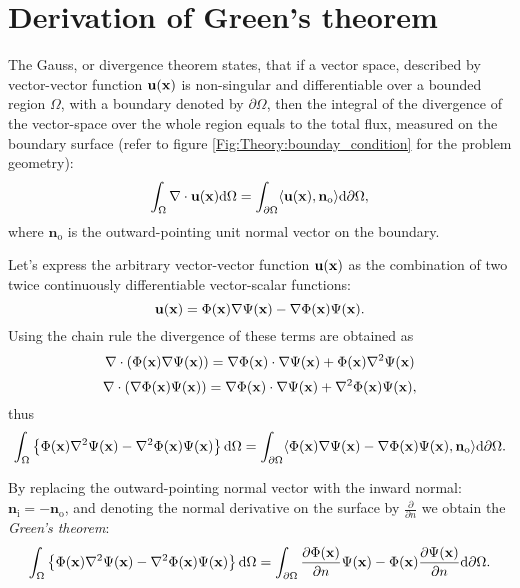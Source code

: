 \section{Derivation of Green's theorem}
\label{App:Green_theorem}

The Gauss, or divergence theorem states, that if a vector space, described by vector-vector function $\mathbf{u}(\mathbf{x})$ is non-singular and differentiable over a bounded region $\Omega$, with a boundary denoted by $\partial \Omega$, then the integral of the divergence of the vector-space over the whole region equals to the total flux, measured on the boundary surface (refer to figure \ref{Fig:Theory:bounday_condition} for the problem geometry):
\begin{equation}
\int_{\Omega} \nabla \cdot \mathbf{u}(\mathbf{x}) \mathrm{d} \Omega = \int_{\partial \Omega} \langle \mathbf{u}(\mathbf{x}),  \mathbf{n}_{\mathrm{o}} \rangle \mathrm{d} \partial\Omega,
\end{equation}
where $\mathbf{n}_{\mathrm{o}} $ is the outward-pointing unit normal vector on the boundary.

Let's express the arbitrary vector-vector function $\mathbf{u}(\mathbf{x})$ as the combination of two twice continuously differentiable vector-scalar functions:
\begin{equation}
\mathbf{u}(\mathbf{x}) = \Phi(\mathbf{x})\nabla \Psi(\mathbf{x}) - \nabla \Phi(\mathbf{x}) \Psi(\mathbf{x}).
\end{equation}
Using the chain rule the divergence of these terms are obtained as
\begin{equation}
\nabla \cdot ( \Phi(\mathbf{x})\nabla \Psi(\mathbf{x}) ) = \nabla \Phi(\mathbf{x})\cdot \nabla \Psi(\mathbf{x}) + \Phi(\mathbf{x}) \nabla^2 \Psi(\mathbf{x})
\end{equation}
\begin{equation}
\nabla \cdot( \nabla \Phi(\mathbf{x}) \Psi(\mathbf{x}) ) = \nabla \Phi(\mathbf{x}) \cdot  \nabla  \Psi(\mathbf{x}) +  \nabla ^2 \Phi(\mathbf{x}) \Psi(\mathbf{x}),
\end{equation}
thus
\begin{equation}
\int_{\Omega} \left\{ \Phi(\mathbf{x}) \nabla^2 \Psi(\mathbf{x}) - \nabla^2 \Phi(\mathbf{x}) \Psi(\mathbf{x}) \right\} \mathrm{d} \Omega = \int_{\partial \Omega} \langle
 \Phi(\mathbf{x}) \nabla \Psi(\mathbf{x}) - \nabla \Phi(\mathbf{x}) \Psi(\mathbf{x}) , \mathbf{n}_{\mathrm{o}} \rangle
 \mathrm{d} \partial\Omega.
\end{equation}

By replacing the outward-pointing normal vector with the inward normal: $\mathbf{n}_{\mathrm{i}} = -\mathbf{n}_{\mathrm{o}}$, and denoting the normal derivative on the surface by $\frac{\partial}{\partial n}$ we obtain the  \emph{Green's theorem}:
\begin{equation}
\int_{\Omega} \left\{ \Phi(\mathbf{x}) \nabla^2 \Psi(\mathbf{x}) - \nabla^2 \Phi(\mathbf{x}) \Psi(\mathbf{x}) \right\} \mathrm{d} \Omega = \int_{\partial \Omega}
\frac{\partial \Phi(\mathbf{x})}{\partial n} \Psi(\mathbf{x})  - \Phi(\mathbf{x}) \frac{\partial \Psi(\mathbf{x})}{\partial n}
 \mathrm{d} \partial\Omega.
\label{Eq:App:Green_theorem}
\end{equation}

